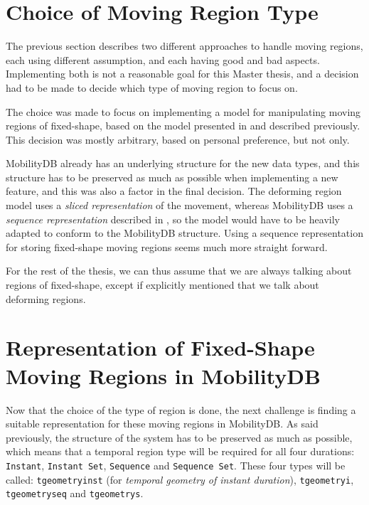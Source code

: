 
\section{Choice of Moving Region Type}
\label{section:region_type_choice}

The previous section describes two different approaches to handle moving regions, each using different assumption, and each having good and bad aspects. Implementing both is not a reasonable goal for this Master thesis, and a decision had to be made to decide which type of moving region to focus on.

The choice was made to focus on implementing a model for manipulating moving regions of fixed-shape, based on the model presented in \cite{fmregion} and described previously. This decision was mostly arbitrary, based on personal preference, but not only. 

MobilityDB already has an underlying structure for the new data types, and this structure has to be preserved as much as possible when implementing a new feature, and this was also a factor in the final decision. The deforming region model uses a \textit{sliced representation} of the movement, whereas MobilityDB uses a \textit{sequence representation} described in \cite{mobilitydb}, so the model would have to be heavily adapted to conform to the MobilityDB structure. Using a sequence representation for storing fixed-shape moving regions seems much more straight forward.

For the rest of the thesis, we can thus assume that we are always talking about regions of fixed-shape, except if explicitly mentioned that we talk about deforming regions.

\section{Representation of Fixed-Shape Moving Regions in MobilityDB}
\label{section:internal_repr}

Now that the choice of the type of region is done, the next challenge is finding a suitable representation for these moving regions in MobilityDB. As said previously, the structure of the system has to be preserved as much as possible, which means that a temporal region type will be required for all four durations: \lstinline{Instant}, \lstinline{Instant Set}, \lstinline{Sequence} and \lstinline{Sequence Set}. These four types will be called: \lstinline{tgeometryinst} (for \textit{temporal geometry of instant duration}), \lstinline{tgeometryi}, \lstinline{tgeometryseq} and \lstinline{tgeometrys}.

